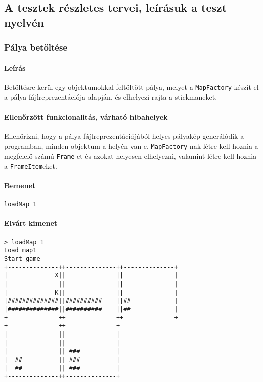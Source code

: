 	
	\subsection{A tesztek részletes tervei, leírásuk a teszt nyelvén}
			\newcommand{\testitem}[1]{\subsubsection{#1}}
			\newcommand{\tdesc}[1]{\paragraph*{Leírás} #1}
			\newcommand{\tcel}[1]{\paragraph*{Ellenőrzött funkcionalitás, várható hibahelyek} #1}
		        
		        \testitem{Pálya betöltése}
		        \tdesc{Betöltésre kerül egy objektumokkal feltöltött pálya, melyet a \texttt{MapFactory} készít el a pálya fájlreprezentációja alapján, és elhelyezi rajta a stickmaneket.}
		        \tcel{Ellenőrizni, hogy a pálya fájlreprezentációjából helyes pályakép generálódik a programban, minden objektum a helyén van-e. \texttt{MapFactory}-nak létre kell hoznia a megfelelő számú \texttt{Frame}-et és azokat helyesen elhelyezni, valamint létre kell hoznia a \texttt{FrameItem}eket.}
		        \paragraph*{Bemenet}
\begin{verbatim}
loadMap 1	
\end{verbatim}
		        \paragraph*{Elvárt kimenet}
\begin{verbatim}
> loadMap 1
Load map1
Start game
+--------------++--------------++--------------+
|             X||              ||              |
|              ||              ||              |
|             K||              ||              |
|##############||##########    ||##            |
|##############||##########    ||##            |
+--------------++--------------++--------------+
+--------------++--------------+                
|              ||              |                
|              ||              |                
|              || ###          |                
|  ##          || ###          |                
|  ##          || ###          |                
+--------------++--------------+      
\end{verbatim}
		        
